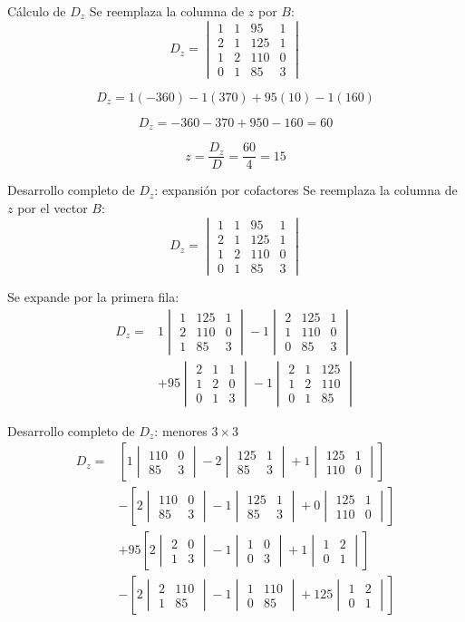 \documentclass[aspectratio=169]{beamer}
\newcommand{\detm}[1]{\begin{vmatrix}#1\end{vmatrix}}
\begin{document}
\begin{frame}[shrink=8]{Cálculo de $D_z$}
Se reemplaza la columna de $z$ por $B$:
\[
D_z=\detm{
1&1&95&1\\
2&1&125&1\\
1&2&110&0\\
0&1&85&3}
\]

\[
D_z=1(-360)-1(370)+95(10)-1(160)
\]

\[
D_z=-360-370+950-160=\boxed{60}
\]

\[
z=\frac{D_z}{D}=\frac{60}{4}=\boxed{15}
\]
\end{frame}

\begin{frame}[shrink=10]{Desarrollo completo de $D_z$: expansión por cofactores}
Se reemplaza la columna de $z$ por el vector $B$:
\[
D_z=\detm{
1&1&95&1\\
2&1&125&1\\
1&2&110&0\\
0&1&85&3}
\]

Se expande por la primera fila:
\[
\begin{aligned}
D_z={}&1\detm{1&125&1\\2&110&0\\1&85&3}
-1\detm{2&125&1\\1&110&0\\0&85&3}\\
&+95\detm{2&1&1\\1&2&0\\0&1&3}
-1\detm{2&1&125\\1&2&110\\0&1&85}
\end{aligned}
\]
\end{frame}

\begin{frame}[shrink=16]{Desarrollo completo de $D_z$: menores $3\times3$}
\[
\begin{aligned}
D_z={}&\left[1\detm{110&0\\85&3}-2\detm{125&1\\85&3}+1\detm{125&1\\110&0}\right]\\
&-\left[2\detm{110&0\\85&3}-1\detm{125&1\\85&3}+0\detm{125&1\\110&0}\right]\\
&+95\left[2\detm{2&0\\1&3}-1\detm{1&0\\0&3}+1\detm{1&2\\0&1}\right]\\
&-\left[2\detm{2&110\\1&85}-1\detm{1&110\\0&85}+125\detm{1&2\\0&1}\right]
\end{aligned}
\]
\end{frame}
\end{document}
